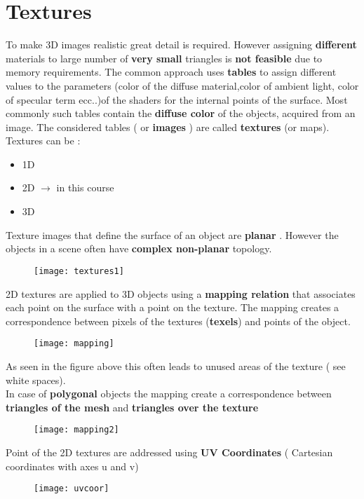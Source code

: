 \newpage
\section{Textures}
To make 3D images realistic great detail is required. However assigning \textbf{different} materials to large number of \textbf{very small} triangles is \textbf{not feasible} due to memory requirements. The common approach uses \textbf{tables  } to assign different values to the parameters (color of the diffuse material,color of ambient light, color of specular term ecc..)of the shaders for the internal points of the surface. Most commonly such tables contain the \textbf{diffuse color} of the objects, acquired from an image. The considered tables ( or \textbf{images} )  are called \textbf{textures} (or maps).\\
Textures can be :
\begin{itemize}
\item 1D
\item 2D $\rightarrow$ in this course
\item 3D
\end{itemize}
Texture images that define the surface of an object are \textbf{planar} . However the objects in a scene often have \textbf{complex non-planar} topology.
\begin{figure}[H]
  \centering
  \texttt{[image: textures1]}
\end{figure}
2D textures are applied to 3D objects using a \textbf{mapping relation} that associates each point on the surface with a point on the texture. The mapping creates a correspondence between pixels of the textures (\textbf{texels}) and points of the object.
\begin{figure}[H]
  \centering
  \texttt{[image: mapping]}
\end{figure}
As seen in the figure above this often leads to unused areas of the texture ( see white spaces).\\
In case of  \textbf{polygonal} objects the mapping create a correspondence between \textbf{triangles of the mesh} and \textbf{triangles over the texture}
\begin{figure}[H]
  \centering
  \texttt{[image: mapping2]}
\end{figure}
Point of the 2D textures are addressed using \textbf{UV Coordinates } ( Cartesian coordinates with axes u and v)
\begin{figure}[H]
  \centering
  \texttt{[image: uvcoor]}
\end{figure}
